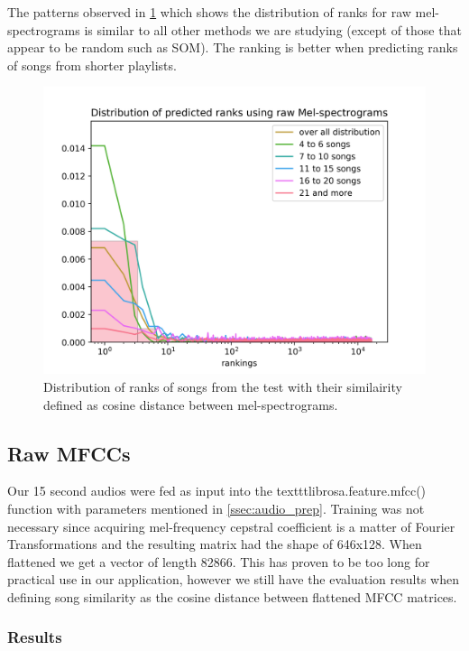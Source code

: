 The patterns observed in \ref{fig:mel_graph} which shows the distribution of ranks for raw mel-spectrograms is similar to all other methods we are studying (except of those that appear to be random such as SOM). The ranking is better when predicting ranks of songs from shorter playlists. 

\begin{figure}[h]
    \centering
	\includegraphics[width=120mm]{./img/mel_graph.png}
	\caption{Distribution of ranks of songs from the test with their similairity defined as cosine distance between mel-spectrograms.}
	\label{fig:mel_graph}
\end{figure}

\subsection{Raw MFCCs}
Our 15 second audios were fed as input into the texttt{librosa.feature.mfcc()} function with parameters mentioned in \ref{ssec:audio_prep}. Training was not necessary since acquiring mel-frequency cepstral coefficient is a matter of Fourier Transformations and the resulting matrix had the shape of 646x128. When flattened we get a vector of length 82866. This has proven to be too long for practical use in our application, however we still have the evaluation results when defining song similarity as the cosine distance between flattened MFCC matrices.

\subsubsection{Results}

